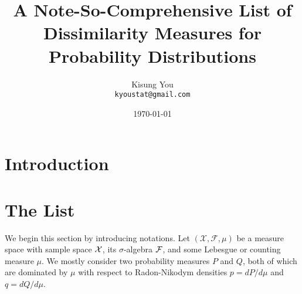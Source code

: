 \documentclass[11pt]{article}
\begin{document}
	
\title{A Note-So-Comprehensive List of \\Dissimilarity Measures for Probability Distributions}
\author[1]{Kisung You\\
	\texttt{kyoustat@gmail.com}}
\date{\today}

\maketitle
\tableofcontents



\section{Introduction}\label{sec:intro}



\section{The List}\label{sec:main}

We begin this section by introducing notations. Let $(\mathcal{X},\mathcal{F}, \mu)$ be a measure space with sample space $\cal{X}$, its $\sigma$-algebra $\cal{F}$, and some Lebesgue or counting measure $\mu$. We mostly consider two probability measures $P$ and $Q$, both of which are dominated by $\mu$ with respect to Radon-Nikodym densities $p = dP/d\mu$ and $q = dQ / d\mu$. 
\end{document}
